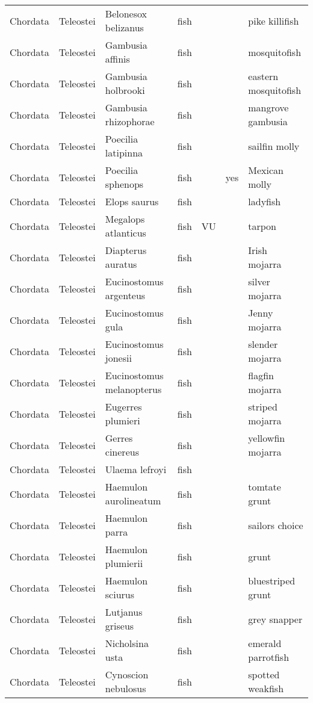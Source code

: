 \begin{longtable}{lllllll}
  Chordata & Teleostei & Belonesox belizanus & fish &  &  & pike killifish \\ 
  Chordata & Teleostei & Gambusia affinis & fish &  &  & mosquitofish \\ 
  Chordata & Teleostei & Gambusia holbrooki & fish &  &  & eastern mosquitofish \\ 
  Chordata & Teleostei & Gambusia rhizophorae & fish &  &  & mangrove gambusia \\ 
  Chordata & Teleostei & Poecilia latipinna & fish &  &  & sailfin molly \\ 
  Chordata & Teleostei & Poecilia sphenops & fish &  & yes & Mexican molly \\ 
  Chordata & Teleostei & Elops saurus & fish &  &  & ladyfish \\ 
  Chordata & Teleostei & Megalops atlanticus & fish & VU &  & tarpon \\ 
  Chordata & Teleostei & Diapterus auratus & fish &  &  & Irish mojarra \\ 
  Chordata & Teleostei & Eucinostomus argenteus & fish &  &  & silver mojarra \\ 
  Chordata & Teleostei & Eucinostomus gula & fish &  &  & Jenny mojarra \\ 
  Chordata & Teleostei & Eucinostomus jonesii & fish &  &  & slender mojarra \\ 
  Chordata & Teleostei & Eucinostomus melanopterus & fish &  &  & flagfin mojarra \\ 
  Chordata & Teleostei & Eugerres plumieri & fish &  &  & striped mojarra \\ 
  Chordata & Teleostei & Gerres cinereus & fish &  &  & yellowfin mojarra \\ 
  Chordata & Teleostei & Ulaema lefroyi & fish &  &  &  \\ 
  Chordata & Teleostei & Haemulon aurolineatum & fish &  &  & tomtate grunt \\ 
  Chordata & Teleostei & Haemulon parra & fish &  &  & sailors choice \\ 
  Chordata & Teleostei & Haemulon plumierii & fish &  &  & grunt \\ 
  Chordata & Teleostei & Haemulon sciurus & fish &  &  & bluestriped grunt \\ 
  Chordata & Teleostei & Lutjanus griseus & fish &  &  & grey snapper \\ 
  Chordata & Teleostei & Nicholsina usta & fish &  &  & emerald parrotfish \\ 
  Chordata & Teleostei & Cynoscion nebulosus & fish &  &  & spotted weakfish \\ 

\end{longtable}
